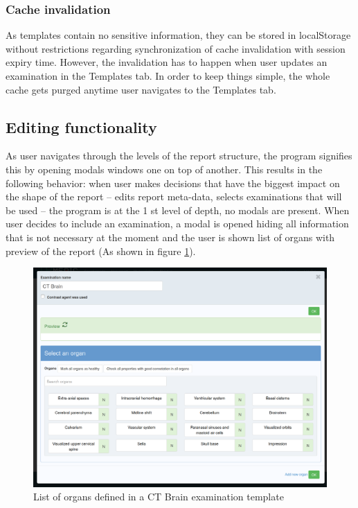 \documentclass[12pt, twoside, openany]{report}
\theoremstyle{definition}
\begin{document}
\subsubsection{Cache invalidation}
As templates contain no sensitive information, they can be stored in localStorage without restrictions regarding synchronization of cache invalidation with session expiry time. However, the invalidation has to happen when user updates an examination in the Templates tab. In order to keep things simple, the whole cache gets purged anytime user navigates to the Templates tab. 

\subsection{Editing functionality}
As user navigates through the levels of the report structure, the program signifies this by opening modals windows one on top of another. This results in the following behavior: when user makes decisions that have the biggest impact on the shape of the report -- edits report meta-data, selects examinations that will be used -- the program is at the 1 st level of depth, no modals are present.
When user decides to include an examination, a modal is opened hiding all information that is not necessary at the moment and the user is shown list of organs with preview of the report (As shown in figure \ref{fig:organ-list}).
\begin{figure}
	\centering
	\includegraphics[width=\linewidth]{organs-modal}
	\caption{List of organs defined in a CT Brain examination template
		\label{fig:organ-list}
	}
\end{figure}
\end{document}

